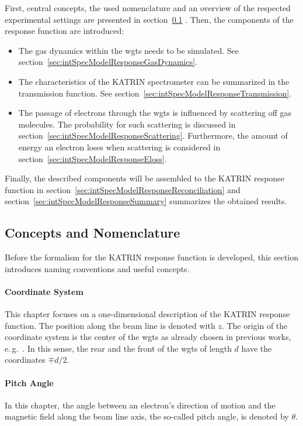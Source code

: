 First, central concepts, the used nomenclature and an overview of the respected experimental settings are presented in section~\ref{sec:intSpecModelResponseConcepts} . Then, the components of the response function are introduced: 
\begin{itemize}
	\item The gas dynamics within the \gls{wgts} needs to be simulated. See section~\ref{sec:intSpecModelResponseGasDynamics}.
	\item The characteristics of the KATRIN spectrometer can be summarized in the transmission function. See section~\ref{sec:intSpecModelResponseTransmission}.
	\item The passage of electrons through the \gls{wgts} is influenced by scattering off gas molecules. The probability for such scattering is discussed in section~\ref{sec:intSpecModelResponseScattering}. Furthermore, the amount of energy an electron loses when scattering is considered in section~\ref{sec:intSpecModelResponseEloss}.
\end{itemize}
Finally, the described components will be assembled to the KATRIN response function in section~\ref{sec:intSpecModelResponseReconciliation} and section~\ref{sec:intSpecModelResponseSummary} summarizes the obtained results.

\subsection{Concepts and Nomenclature}
\label{sec:intSpecModelResponseConcepts}
Before the formalism for the KATRIN response function is developed, this section introduces naming conventions and useful concepts. 

\paragraph{Coordinate System}
This chapter focuses on a one-dimensional description of the KATRIN response function. The position along the beam line is denoted with $z$. The origin of the coordinate system is the center of the \gls{wgts} as already chosen in previous works, e.\,g.~\cite{Groh2015,Kleesiek2014}. In this sense, the rear and the front of the \gls{wgts} of length $d$ have the coordinates $\mp d/2$.

\paragraph{Pitch Angle}
In this chapter, the angle between an electron's direction of motion and the magnetic field along the beam line axis, the so-called pitch angle, is denoted by $\theta$.


